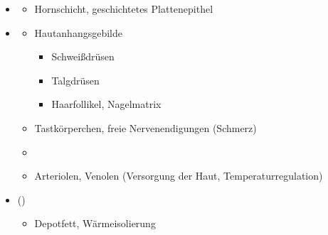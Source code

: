 {
\begin{itemize}
  \item {}  
  \begin{itemize}
    \item Hornschicht, geschichtetes Plattenepithel
  \end{itemize}
  \item {} 
  \begin{itemize}
    \item Hautanhangsgebilde
    \begin{itemize}
      \item Schweißdrüsen
      \item Talgdrüsen
      \item Haarfollikel, Nagelmatrix
    \end{itemize}
    \item Tastkörperchen, freie Nervenendigungen (Schmerz)
    \item {}
    \item Arteriolen, Venolen (Versorgung der Haut, Temperaturregulation)
  \end{itemize}
  \item {} () 
  \begin{itemize}
    \item Depotfett, Wärmeisolierung
  \end{itemize}
\end{itemize}
}





